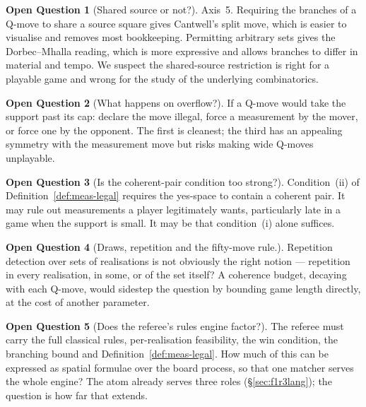 \documentclass[11pt,a4paper]{article}
\theoremstyle{definition}
\newtheorem{question}{Open Question}
\theoremstyle{plain}
\begin{document}
\begin{question}[Shared source or not?]
\label{q:source}
Axis~5. Requiring the branches of a Q-move to share a source square gives
Cantwell's split move, which is easier to visualise and removes most
bookkeeping. Permitting arbitrary sets gives the Dorbec--Mhalla reading, which
is more expressive and allows branches to differ in material and tempo. We
suspect the shared-source restriction is right for a playable game and wrong
for the study of the underlying combinatorics.
\end{question}

\begin{question}[What happens on overflow?]
\label{q:overflow}
If a Q-move would take the support past its cap: declare the move illegal,
force a measurement by the mover, or force one by the opponent. The first is
cleanest; the third has an appealing symmetry with the measurement move but
risks making wide Q-moves unplayable.
\end{question}

\begin{question}[Is the coherent-pair condition too strong?]
\label{q:coherent}
Condition~(ii) of Definition~\ref{def:meas-legal} requires the yes-space to
contain a coherent pair. It may rule out measurements a player legitimately
wants, particularly late in a game when the support is small. It may be that
condition~(i) alone suffices.
\end{question}

\begin{question}[Draws, repetition and the fifty-move rule.]
\label{q:draws}
Repetition detection over sets of realisations is not obviously the right
notion --- repetition in every realisation, in some, or of the set itself? A
coherence budget, decaying with each Q-move, would sidestep the question by
bounding game length directly, at the cost of another parameter.
\end{question}

\begin{question}[Does the referee's rules engine factor?]
\label{q:referee}
The referee must carry the full classical rules, per-realisation feasibility,
the win condition, the branching bound and
Definition~\ref{def:meas-legal}. How much of this can be expressed as spatial
formulae over the board process, so that one matcher serves the whole engine?
The atom already serves three roles (\S\ref{sec:f1r3lang}); the question is how
far that extends.
\end{question}
\end{document}
